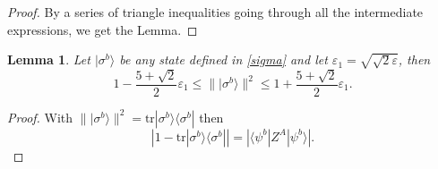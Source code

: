 \documentclass[onecolumn,prx,amsmath,amssymb,12pt]{revtex4-2}
\newtheorem{lem}{Lemma}
\def\be{\begin{equation}}
\def\ee{\end{equation}}
\def\bra#1{\langle#1|} \def\ket#1{|#1\rangle}
\def\proj#1{\ket{#1}\!\bra{#1}}
\def\id{{\mathbb I}}
\def\tr{\mbox{tr}}
\def\norm#1{\| #1 \| }
\def\abs#1{|#1|}
\begin{document}
\begin{appendix}
\begin{proof}
By a series of triangle inequalities going through all the intermediate expressions, we get the Lemma.
\end{proof}

\begin{lem} \label{lem2} Let $\ket{\sigma^b}$ be any state defined in \eqref{sigma} and let $\varepsilon_1=\sqrt{\sqrt{2}\varepsilon}$, then
\begin{equation}\label{eq:lem2}
1-\frac{5+\sqrt{2}}{2}\varepsilon_1 \leq \norm{\ket{\sigma^b}}^2 \leq 1 + \frac{5+\sqrt{2}}{2}\varepsilon_1.
\end{equation}
\end{lem}

\begin{proof}
With $\norm{\ket{\sigma^b}}^2 = \tr{\proj{\sigma^b}}$ then
\be\label{eq:lem2b}
\abs{1-\tr{\proj{\sigma^b}}} = \abs{\bra{\psi^b} Z^A \ket{\psi^b}}.
\ee


\end{proof}
\end{appendix}
\end{document}
